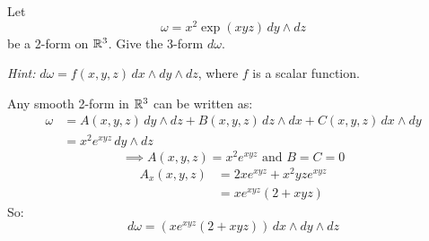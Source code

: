 \begin{exercise}
	Let
	$$
		\omega = x^2 \exp(xyz) \, dy \wedge dz
	$$
	be a 2-form on $\mathbb{R}^3$. Give the 3-form $d\omega$.

	\emph{Hint:} $d\omega = f(x,y,z) \, dx \wedge dy \wedge dz$, where $f$ is a scalar function.
\end{exercise}

\begin{solution}
	Any smooth 2-form in $\mathbb{R}^3$ can be written as:
	$$
		\begin{aligned}
			\omega & = A(x,y,z) \, dy \wedge dz + B(x,y,z)\, dz \wedge dx + C(x,y,z) \, dx \wedge dy \\
			       & = x^2 e^{xyz} \, dy \wedge dz
		\end{aligned}
	$$
	$$
		\implies A(x,y,z) = x^2 e^{xyz} \text{ and } B = C = 0
	$$
	$$
		\begin{aligned}
			A_x(x,y,z) & = 2x e^{xyz} + x^2 yz e^{xyz} \\
			           & = x e^{xyz} ( 2 + xyz )
		\end{aligned}
	$$
	So:
	$$
		d\omega = \left(x e^{xyz} ( 2 + xyz) \right) \, dx \wedge dy \wedge dz
	$$
\end{solution}
